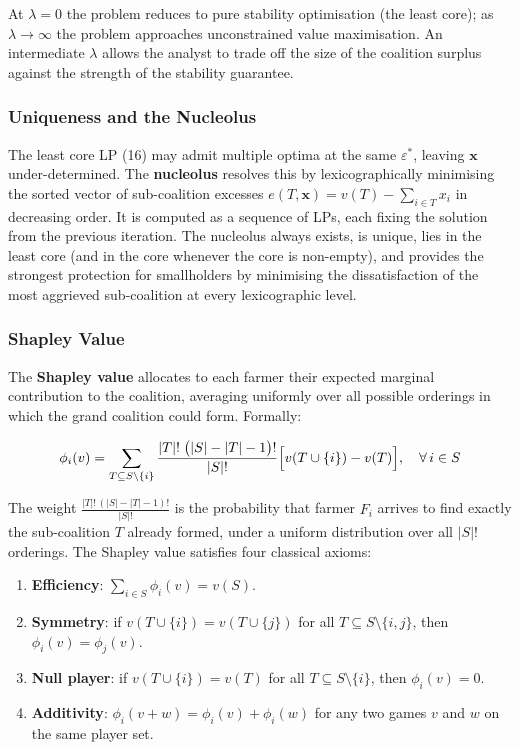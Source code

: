 \documentclass[manuscript, screen, review, anonymous]{acmart}
\begin{document}
At $\lambda = 0$ the problem reduces to pure stability optimisation (the least
core); as $\lambda \to \infty$ the problem approaches unconstrained value
maximisation. An intermediate $\lambda$ allows the analyst to trade off the
size of the coalition surplus against the strength of the stability guarantee.

\subsubsection*{Uniqueness and the Nucleolus}

The least core LP (16) may admit multiple optima at the same $\varepsilon^*$,
leaving $\mathbf{x}$ under-determined. The \textbf{nucleolus} resolves this by
lexicographically minimising the sorted vector of sub-coalition excesses
$e(T, \mathbf{x}) = v(T) - \sum_{i \in T} x_i$ in decreasing order. It is
computed as a sequence of LPs, each fixing the solution from the previous
iteration. The nucleolus always exists, is unique, lies in the least core (and
in the core whenever the core is non-empty), and provides the strongest
protection for smallholders by minimising the dissatisfaction of the most
aggrieved sub-coalition at every lexicographic level.

\subsubsection*{Shapley Value}

The \textbf{Shapley value} allocates to each farmer their expected marginal
contribution to the coalition, averaging uniformly over all possible orderings
in which the grand coalition could form. Formally:

\begin{equation}
    \phi_i(v) = \sum_{T \subseteq S \setminus \{i\}}
    \frac{|T|!\;\bigl(|S| - |T| - 1\bigr)!}{|S|!}
    \Bigl[v\!\left(T \cup \{i\}\right) - v(T)\Bigr],
    \quad \forall\, i \in S
\end{equation}

\noindent The weight $\tfrac{|T|!\,(|S|-|T|-1)!}{|S|!}$ is the probability
that farmer $F_i$ arrives to find exactly the sub-coalition $T$ already formed,
under a uniform distribution over all $|S|!$ orderings.
The Shapley value satisfies four classical axioms:

\begin{enumerate}
    \item \textbf{Efficiency}: $\sum_{i \in S} \phi_i(v) = v(S)$.
    \item \textbf{Symmetry}: if $v(T \cup \{i\}) = v(T \cup \{j\})$ for all
          $T \subseteq S \setminus \{i,j\}$, then $\phi_i(v) = \phi_j(v)$.
    \item \textbf{Null player}: if $v(T \cup \{i\}) = v(T)$ for all
          $T \subseteq S \setminus \{i\}$, then $\phi_i(v) = 0$.
    \item \textbf{Additivity}: $\phi_i(v + w) = \phi_i(v) + \phi_i(w)$ for
          any two games $v$ and $w$ on the same player set.
\end{enumerate}
\end{document}
